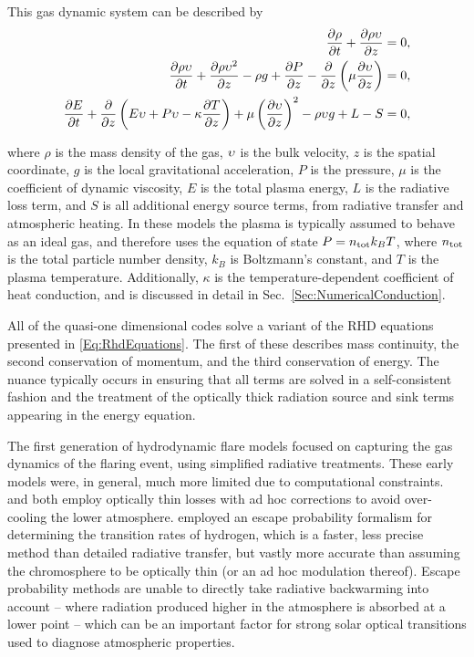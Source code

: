 This gas dynamic system can be described by
\begin{equation}
    \begin{aligned}
    \frac{\partial \rho}{\partial t} + \frac{\partial \rho \upsilon}{\partial z} &= 0,\\
    \frac{\partial \rho \upsilon}{\partial t} + \frac{\partial \rho \upsilon^2}{\partial z} - \rho g + \frac{\partial P}{\partial z} - \frac{\partial}{\partial z}\left(\mu \frac{\partial \upsilon}{\partial z}\right) &= 0,\\
    \frac{\partial E}{\partial t} + \frac{\partial}{\partial z}\left( E\upsilon + P\upsilon - \kappa\frac{\partial T}{\partial z} \right)+ \mu\left(\frac{\partial \upsilon}{\partial z}\right)^2 -\rho \upsilon g + L - S &= 0,
    \end{aligned}\label{Eq:RhdEquations}
\end{equation}

where $\rho$ is the mass density of the gas, $\upsilon$ is the bulk velocity, $z$ is the spatial coordinate, $g$ is the local gravitational acceleration, $P$ is the pressure, $\mu$ is the coefficient of dynamic viscosity, $E$ is the total plasma energy, $L$ is the radiative loss term, and $S$ is all additional energy source terms, from radiative transfer and atmospheric heating.
In these models the plasma is typically assumed to behave as an ideal gas, and therefore uses the equation of state
$P = n_{\textnormal{tot}} k_B T$, where $n_{\textnormal{tot}}$ is the total particle number density, $k_B$ is Boltzmann's constant, and $T$ is the plasma temperature. Additionally, $\kappa$ is the temperature-dependent coefficient of heat conduction, and is discussed in detail in Sec.~\ref{Sec:NumericalConduction}.

All of the quasi-one dimensional codes solve a variant of the RHD equations presented in \eqref{Eq:RhdEquations}. The first of these describes mass continuity, the second conservation of momentum, and the third conservation of energy.
The nuance typically occurs in ensuring that all terms are solved in a self-consistent fashion and the treatment of the optically thick radiation source and sink terms appearing in the energy equation.

The first generation of hydrodynamic flare models \citep{Nagai1980,Mariska1982,McClymont1983} focused on capturing the gas dynamics of the flaring event, using simplified radiative treatments.
These early models were, in general, much more limited due to computational constraints. \citet{Nagai1980} and \citet{Mariska1982} both employ optically thin losses with ad hoc corrections to avoid over-cooling the lower atmosphere.
\citet{McClymont1983} employed an escape probability formalism for determining the transition rates of hydrogen, which is a faster, less precise method than detailed radiative transfer, but vastly more accurate than assuming the chromosphere to be optically thin (or an ad hoc modulation thereof).
Escape probability methods are unable to directly take radiative backwarming into account -- where radiation produced higher in the atmosphere is absorbed at a lower point -- which can be an important factor for strong solar optical transitions used to diagnose atmospheric properties.

